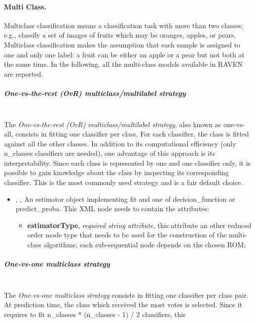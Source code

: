 \paragraph{Multi Class.}
\label{Multiclass}
Multiclass classification means a classification task with more than two
classes; e.g., classify a set of images of fruits which may be oranges, apples,
or pears.
%
Multiclass classification makes the assumption that each sample is assigned to
one and only one label: a fruit can be either an apple or a pear but not both at
the same time.
%
In the following, all the multi-class models available in RAVEN are reported.
%
\subparagraph{One-vs-the-rest (OvR) multiclass/multilabel strategy}
\mbox{}
\\The \textit{One-vs-the-rest (OvR) multiclass/multilabel strategy}, also known
as one-vs-all, consists in fitting one classifier per class.
%
For each classifier, the class is fitted against all the other classes.
%
In addition to its computational efficiency (only n\_classes classifiers are
needed), one advantage of this approach is its interpretability.
%
Since each class is represented by one and one classifier only, it is possible
to gain knowledge about the class by inspecting its corresponding classifier.
%
This is the most commonly used strategy and is a fair default choice.
%
\begin{itemize}
  \item {}, ,
  An estimator object implementing fit and one of decision\_function or
  predict\_proba.
  This XML node needs to contain the attributes:
  \vspace{-5mm}
  \begin{itemize}
    \itemsep0em
    \item \textbf{estimatorType}, \textit{required string attribute}, this
    attribute an other reduced order mode type that needs to be used for the
    construction of the multi-class algorithms; each sub-sequential node depends
    on the chosen ROM;
  \end{itemize}
\end{itemize}
\subparagraph{One-vs-one multiclass strategy}
\mbox{}
\\The \textit{One-vs-one multiclass strategy} consists in fitting one classifier
per class pair.
%
At prediction time, the class which received the most votes is selected.
%
Since it requires to fit n\_classes * (n\_classes - 1) / 2 classifiers, this
